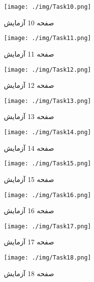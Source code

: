 { 
\begin{figure}[htpb]
\centering
\texttt{[image: ./img/Task10.png]}
\caption{ صفحه 10 آزمایش }
\label{fig:Task10}
\end{figure}
 
 
\begin{figure}[htpb]
\centering
\texttt{[image: ./img/Task11.png]}
\caption{ صفحه 11 آزمایش }
\label{fig:Task11}
\end{figure}
 
 
\begin{figure}[htpb]
\centering
\texttt{[image: ./img/Task12.png]}
\caption{ صفحه 12 آزمایش }
\label{fig:Task12}
\end{figure}
 
 
\begin{figure}[htpb]
\centering
\texttt{[image: ./img/Task13.png]}
\caption{ صفحه 13 آزمایش }
\label{fig:Task13}
\end{figure}
 
 
\begin{figure}[htpb]
\centering
\texttt{[image: ./img/Task14.png]}
\caption{ صفحه 14 آزمایش }
\label{fig:Task14}
\end{figure}
 
 
\begin{figure}[htpb]
\centering
\texttt{[image: ./img/Task15.png]}
\caption{ صفحه 15 آزمایش }
\label{fig:Task15}
\end{figure}
 
 
\begin{figure}[htpb]
\centering
\texttt{[image: ./img/Task16.png]}
\caption{ صفحه 16 آزمایش }
\label{fig:Task16}
\end{figure}
 
 
\begin{figure}[htpb]
\centering
\texttt{[image: ./img/Task17.png]}
\caption{ صفحه 17 آزمایش }
\label{fig:Task17}
\end{figure}
 
 
\begin{figure}[htpb]
\centering
\texttt{[image: ./img/Task18.png]}
\caption{ صفحه 18 آزمایش }
\label{fig:Task18}
\end{figure}
 
}
